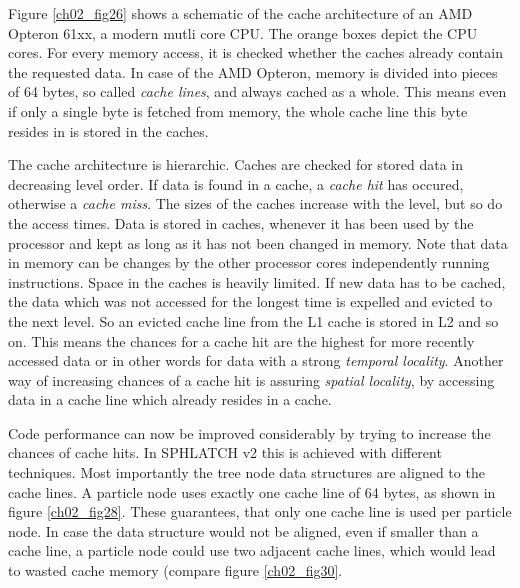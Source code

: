 Figure \ref{ch02_fig26} shows a schematic of the cache architecture of an AMD Opteron 61xx, a modern mutli core CPU. The orange boxes depict the CPU cores. For every memory access, it is checked whether the caches already contain the requested data. In case of the AMD Opteron, memory is divided into pieces of 64 bytes, so called \emph{cache lines}, and always cached as a whole. This means even if only a single byte is fetched from memory, the whole cache line this byte resides in is stored in the caches.

The cache architecture is hierarchic. Caches are checked for stored data in decreasing level order. If data is found in a cache, a \emph{cache hit} has occured, otherwise a \emph{cache miss}. The sizes of the caches increase with the level, but so do the access times. Data is stored in caches, whenever it has been used by the processor and kept as long as it has not been changed in memory. Note that data in memory can be changes by the other processor cores independently running instructions. Space in the caches is heavily limited. If new data has to be cached, the data which was not accessed for the longest time is expelled and evicted to the next level. So an evicted cache line from the L1 cache is stored in L2 and so on. This means the chances for a cache hit are the highest for more recently accessed data or in other words for data with a strong \emph{temporal locality}. Another way of increasing chances of a cache hit is assuring \emph{spatial locality}, by accessing data in a cache line which already resides in a cache.

Code performance can now be improved considerably by trying to increase the chances of cache hits. In SPHLATCH v2 this is achieved with different techniques. Most importantly the tree node data structures are aligned to the cache lines. A particle node uses exactly one cache line of 64 bytes, as shown in figure \ref{ch02_fig28}. These guarantees, that only one cache line is used per particle node. In case the data structure would not be aligned, even if smaller than a cache line, a particle node could use two adjacent cache lines, which would lead to wasted cache memory (compare figure \ref{ch02_fig30}.


